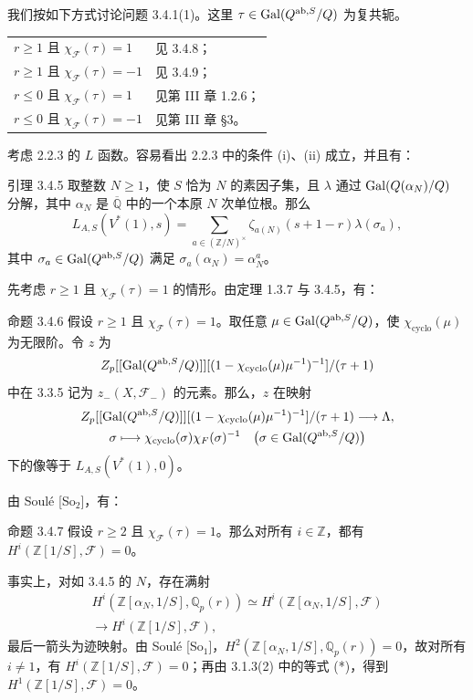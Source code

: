 我们按如下方式讨论问题 3.4.1(1)。这里 $\tau\in\operatorname{Gal}(Q^{\mathrm{ab},S}/Q)$ 为复共轭。
\begin{center}
\begin{tabular}{ll}
$r\ge1$ 且 $\chi_{\mathcal F}(\tau)=1$ & 见 3.4.8；\\
$r\ge1$ 且 $\chi_{\mathcal F}(\tau)=-1$ & 见 3.4.9；\\
$r\le0$ 且 $\chi_{\mathcal F}(\tau)=1$ & 见第 III 章 1.2.6；\\
$r\le0$ 且 $\chi_{\mathcal F}(\tau)=-1$ & 见第 III 章 §3。
\end{tabular}
\end{center}

考虑 2.2.3 的 $L$ 函数。容易看出 2.2.3 中的条件 (i)、(ii) 成立，并且有：

\begin{statement}{引理 3.4.5}
取整数 $N\ge1$，使 $S$ 恰为 $N$ 的素因子集，且 $\lambda$ 通过 $\operatorname{Gal}(Q(\alpha_N)/Q)$ 分解，其中 $\alpha_N$ 是 $\overline{\mathbb Q}$ 中的一个本原 $N$ 次单位根。那么
\[
 L_{A,S}(V^*(1),s)
 =\sum_{a\in(\mathbb Z/N)^\times}\zeta_{a(N)}(s+1-r)\lambda(\sigma_a),
\]
其中 $\sigma_a\in\operatorname{Gal}(Q^{\mathrm{ab},S}/Q)$ 满足 $\sigma_a(\alpha_N)=\alpha_N^a$。
\end{statement}

先考虑 $r\ge1$ 且 $\chi_{\mathcal F}(\tau)=1$ 的情形。由定理 1.3.7 与 3.4.5，有：

\begin{statement}{命题 3.4.6}
假设 $r\ge1$ 且 $\chi_{\mathcal F}(\tau)=1$。取任意 $\mu\in\operatorname{Gal}(Q^{\mathrm{ab},S}/Q)$，使 $\chi_{\mathrm{cyclo}}(\mu)$ 为无限阶。令 $z$ 为
\[
 Z_p[[\operatorname{Gal}(Q^{\mathrm{ab},S}/Q)]]
 [(1-\chi_{\mathrm{cyclo}}(\mu)\mu^{-1})^{-1}]/(\tau+1)
\]
中在 3.3.5 记为 $z_-(X,\mathcal F_-)$ 的元素。那么，$z$ 在映射
\[
 \begin{gathered}
 Z_p[[\operatorname{Gal}(Q^{\mathrm{ab},S}/Q)]]
 [(1-\chi_{\mathrm{cyclo}}(\mu)\mu^{-1})^{-1}]/(\tau+1)
 \longrightarrow\Lambda,\\
 \sigma\longmapsto\chi_{\mathrm{cyclo}}(\sigma)\chi_{F}(\sigma)^{-1}
 \quad\bigl(\sigma\in\operatorname{Gal}(Q^{\mathrm{ab},S}/Q)\bigr)
 \end{gathered}
\]
下的像等于 $L_{A,S}(V^*(1),0)$。
\end{statement}

由 Soulé [So$_2$]，有：
\begin{statement}{命题 3.4.7}
假设 $r\ge2$ 且 $\chi_{\mathcal F}(\tau)=1$。那么对所有 $i\in\mathbb Z$，都有 $H^i(\mathbb Z[1/S],\mathcal F)=0$。
\end{statement}
事实上，对如 3.4.5 的 $N$，存在满射
\[
 \begin{gathered}
 H^i(\mathbb Z[\alpha_N,1/S],\mathbb Q_p(r))
 \simeq H^i(\mathbb Z[\alpha_N,1/S],\mathcal F)\\
 \longrightarrow H^i(\mathbb Z[1/S],\mathcal F),
 \end{gathered}
\]
最后一箭头为迹映射。由 Soulé [So$_1$]，$H^2(\mathbb Z[\alpha_N,1/S],\mathbb Q_p(r))=0$，故对所有 $i\ne1$，有 $H^i(\mathbb Z[1/S],\mathcal F)=0$；再由 3.1.3(2) 中的等式 (*)，得到 $H^1(\mathbb Z[1/S],\mathcal F)=0$。

